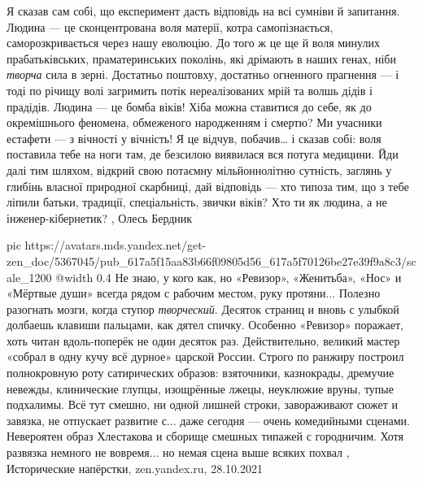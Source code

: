 Я сказав сам собі, що експеримент дасть відповідь на всі сумніви й запитання.
Людина — це сконцентрована воля матерії, котра самопізнається,
саморозкривається через нашу еволюцію. До того ж це ще й воля минулих
прабатьківських, праматеринських поколінь, які дрімають в наших генах, ніби
\emph{творча} сила в зерні. Достатньо поштовху, достатньо огненного прагнення — і тоді
по річищу волі загримить потік нереалізованих мрій та волшь дідів і прадідів.
Людина — це бомба віків! Хіба можна ставитися до себе, як до окремішнього
феномена, обмеженого народженням і смертю? Ми учасники естафети — з вічності у
вічність! Я це відчув, побачив… і сказав собі: воля поставила тебе на ноги там,
де безсилою виявилася вся потуга медицини. Йди далі тим шляхом, відкрий свою
потаємну мільйоннолітню сутність, заглянь у глибінь власної природної
скарбниці, дай відповідь — хто типоза тим, що з тебе ліпили батьки, традиції,
спеціальність, звички віків? Хто ти як людина, а не інженер-кібернетик?
, Олесь Бердник

\ifcmt
  pic https://avatars.mds.yandex.net/get-zen_doc/5367045/pub_617a5f15aa83b66f09805d56_617a5f70126be27e39f9a8c3/scale_1200
  @width 0.4
\fi
Не знаю, у кого как, но «Ревизор», «Женитьба», «Нос» и «Мёртвые души» всегда
рядом с рабочим местом, руку протяни... Полезно разогнать мозги, когда ступор
\emph{творческий}. Десяток страниц и вновь с улыбкой долбаешь клавиши пальцами,
как дятел спичку.  Особенно «Ревизор» поражает, хоть читан вдоль-поперёк не
один десяток раз.  Действительно, великий мастер «собрал в одну кучу всё
дурное» царской России.  Строго по ранжиру построил полнокровную роту
сатирических образов: взяточники, казнокрады, дремучие невежды, клинические
глупцы, изощрённые лжецы, неуклюжие вруны, тупые подхалимы.  Всё тут смешно, ни
одной лишней строки, завораживают сюжет и завязка, не отпускает развитие с...
даже сегодня — очень комедийными сценами. Невероятен образ Хлестакова и сборище
смешных типажей с городничим. Хотя развязка немного не вовремя... но немая сцена
выше всяких похвал
, 
Исторические напёрстки, zen.yandex.ru, 28.10.2021
